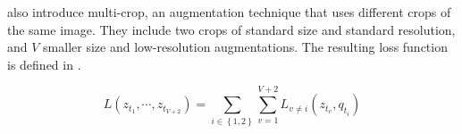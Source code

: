 \citeauthor{swav_2020} also introduce multi-crop, an augmentation technique that uses different 
crops of the same image.
They include two crops of standard size and standard resolution, 
and $V$ smaller size and low-resolution augmentations.
The resulting loss function is defined in .

\begin{equation}
    L(z_{t_{1}}, \cdots , z_{t_{V+2}})= \sum_{i\in \left\{ 1,2 \right\} }^{}\sum_{v=1}^{V+2} L_{v \neq i}(z_{t_{v}}, q_{t_{i}})
    \label{eq:swav_loss_multicrop}
\end{equation}